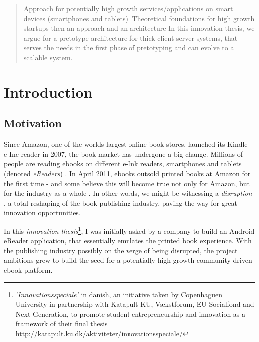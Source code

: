 \documentclass[a4paper,10pt]{article}
\begin{document}
\begin{abstract}
Approach for potentially high growth services/applications on smart devices (smartphones and tablets).
Theoretical foundations for high growth startups then an approach and an architecture 
In this innovation thesis, we argue for a pretotype architecture for thick client server systems, 
that serves the needs in the first phase of pretotyping and can evolve to a scalable system.
\end{abstract}

\newpage

\tableofcontents

\newpage

\section{Introduction}

\subsection{Motivation}
Since Amazon, one of the worlds largest online book stores, launched its Kindle e-Inc reader in 2007, the book market has undergone a big change. 
Millions of people are reading ebooks on different e-Ink readers, smartphones and tablets (denoted \emph{eReaders}) \cite{1}\cite{2}\cite{3}\cite{4}\cite{adultEbookSecondLargestBookFormat}.
In April 2011, ebooks outsold printed books at Amazon for the first time \cite{amazonEbookSurpassedPrint} - and some 
believe this will become true not only for Amazon, 
but for the industry as a whole \cite{barnesEbookPassPrint}\cite{halfPreditEbookDominant2014}.
In other words, we might be witnessing a \emph{disruption} \cite{amazonDisruptionUnforldingTimothy}\cite{amazonVsSonyReaderDisrupting}, a total reshaping of the book publishing industry, 
paving the way for great innovation opportunities. 


In this \emph{innovation thesis}\footnote{\emph{'Innovationsspeciale'} in danish, an initiative taken by Copenhaguen University
	in partnership with Katapult KU, Vækstforum, EU Socialfond and Next Generation, to promote student entrepreneurship and 
	innovation as a framework of their final thesis http://katapult.ku.dk/aktiviteter/innovationsspeciale/}, 
I was initially asked by a company to build an Android eReader application, that essentially emulates the printed book experience. 
With the publishing industry possibly on the verge of being disrupted, 
the project ambitions grew to build the seed for a potentially high growth community-driven ebook platform.
\end{document}
